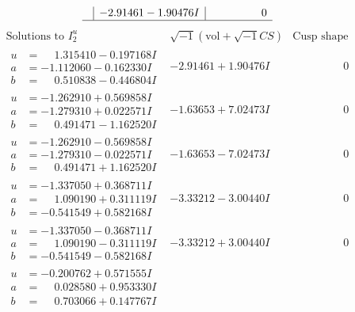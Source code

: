 \documentclass[1p]{elsarticle_modified}
\theoremstyle{definition}
\newcommand{\I}{\sqrt{-1}}
\begin{document}
$$\begin{array}{c|c|c}
 & -2.91461 - 1.90476 I & \phantom{-0.000000 } 0\\
 \hline 
 \end{array}$$\newpage$$\begin{array}{c|c|c}  
\text{Solutions to }I^u_{2}& \I (\text{vol} + \sqrt{-1}CS) & \text{Cusp shape}\\
 \hline 
\begin{aligned}
u &= \phantom{-}1.315410 - 0.197168 I \\
a &= -1.112060 - 0.162330 I \\
b &= \phantom{-}0.510838 - 0.446804 I\end{aligned}
 & -2.91461 + 1.90476 I & \phantom{-0.000000 } 0 \\ \hline\begin{aligned}
u &= -1.262910 + 0.569858 I \\
a &= -1.279310 + 0.022571 I \\
b &= \phantom{-}0.491471 - 1.162520 I\end{aligned}
 & -1.63653 + 7.02473 I & \phantom{-0.000000 } 0 \\ \hline\begin{aligned}
u &= -1.262910 - 0.569858 I \\
a &= -1.279310 - 0.022571 I \\
b &= \phantom{-}0.491471 + 1.162520 I\end{aligned}
 & -1.63653 - 7.02473 I & \phantom{-0.000000 } 0 \\ \hline\begin{aligned}
u &= -1.337050 + 0.368711 I \\
a &= \phantom{-}1.090190 + 0.311119 I \\
b &= -0.541549 + 0.582168 I\end{aligned}
 & -3.33212 - 3.00440 I & \phantom{-0.000000 } 0 \\ \hline\begin{aligned}
u &= -1.337050 - 0.368711 I \\
a &= \phantom{-}1.090190 - 0.311119 I \\
b &= -0.541549 - 0.582168 I\end{aligned}
 & -3.33212 + 3.00440 I & \phantom{-0.000000 } 0 \\ \hline\begin{aligned}
u &= -0.200762 + 0.571555 I \\
a &= \phantom{-}0.028580 + 0.953330 I \\
b &= \phantom{-}0.703066 + 0.147767 I\end{aligned}

\end{array}$$
\end{document}

